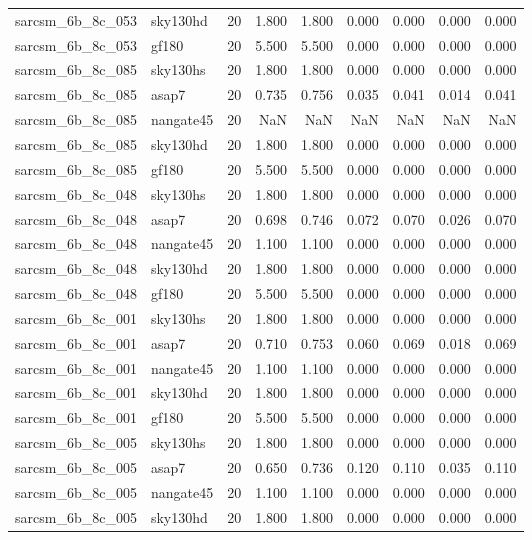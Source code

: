 \begin{tabular}{llrrrrrrr}
sarcsm\_6b\_8c\_053 & sky130hd & 20 & 1.800 & 1.800 & 0.000 & 0.000 & 0.000 & 0.000 \\
sarcsm\_6b\_8c\_053 & gf180 & 20 & 5.500 & 5.500 & 0.000 & 0.000 & 0.000 & 0.000 \\
sarcsm\_6b\_8c\_085 & sky130hs & 20 & 1.800 & 1.800 & 0.000 & 0.000 & 0.000 & 0.000 \\
sarcsm\_6b\_8c\_085 & asap7 & 20 & 0.735 & 0.756 & 0.035 & 0.041 & 0.014 & 0.041 \\
sarcsm\_6b\_8c\_085 & nangate45 & 20 & NaN & NaN & NaN & NaN & NaN & NaN \\
sarcsm\_6b\_8c\_085 & sky130hd & 20 & 1.800 & 1.800 & 0.000 & 0.000 & 0.000 & 0.000 \\
sarcsm\_6b\_8c\_085 & gf180 & 20 & 5.500 & 5.500 & 0.000 & 0.000 & 0.000 & 0.000 \\
sarcsm\_6b\_8c\_048 & sky130hs & 20 & 1.800 & 1.800 & 0.000 & 0.000 & 0.000 & 0.000 \\
sarcsm\_6b\_8c\_048 & asap7 & 20 & 0.698 & 0.746 & 0.072 & 0.070 & 0.026 & 0.070 \\
sarcsm\_6b\_8c\_048 & nangate45 & 20 & 1.100 & 1.100 & 0.000 & 0.000 & 0.000 & 0.000 \\
sarcsm\_6b\_8c\_048 & sky130hd & 20 & 1.800 & 1.800 & 0.000 & 0.000 & 0.000 & 0.000 \\
sarcsm\_6b\_8c\_048 & gf180 & 20 & 5.500 & 5.500 & 0.000 & 0.000 & 0.000 & 0.000 \\
sarcsm\_6b\_8c\_001 & sky130hs & 20 & 1.800 & 1.800 & 0.000 & 0.000 & 0.000 & 0.000 \\
sarcsm\_6b\_8c\_001 & asap7 & 20 & 0.710 & 0.753 & 0.060 & 0.069 & 0.018 & 0.069 \\
sarcsm\_6b\_8c\_001 & nangate45 & 20 & 1.100 & 1.100 & 0.000 & 0.000 & 0.000 & 0.000 \\
sarcsm\_6b\_8c\_001 & sky130hd & 20 & 1.800 & 1.800 & 0.000 & 0.000 & 0.000 & 0.000 \\
sarcsm\_6b\_8c\_001 & gf180 & 20 & 5.500 & 5.500 & 0.000 & 0.000 & 0.000 & 0.000 \\
sarcsm\_6b\_8c\_005 & sky130hs & 20 & 1.800 & 1.800 & 0.000 & 0.000 & 0.000 & 0.000 \\
sarcsm\_6b\_8c\_005 & asap7 & 20 & 0.650 & 0.736 & 0.120 & 0.110 & 0.035 & 0.110 \\
sarcsm\_6b\_8c\_005 & nangate45 & 20 & 1.100 & 1.100 & 0.000 & 0.000 & 0.000 & 0.000 \\
sarcsm\_6b\_8c\_005 & sky130hd & 20 & 1.800 & 1.800 & 0.000 & 0.000 & 0.000 & 0.000 \\

\end{tabular}

